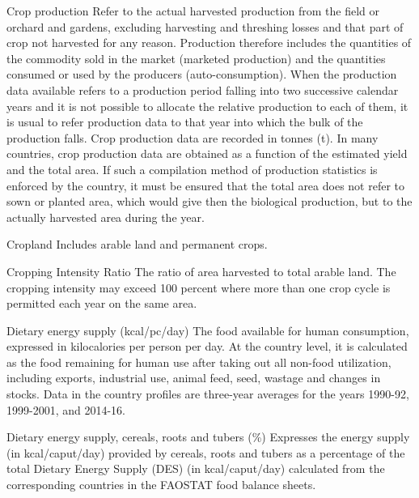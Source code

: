 \begin{MetadataCollection} {}
\begin{metadata}{Crop production} {}
Refer to the actual harvested production from the field or orchard and gardens, excluding harvesting and threshing losses and that part of crop not harvested for any reason. Production therefore includes the quantities of the commodity sold in the market (marketed production) and the quantities consumed or used by the producers (auto-consumption). When the production data available refers to a production period falling into two successive calendar years and it is not possible to allocate the relative production to each of them, it is usual to refer production data to that year into which the bulk of the production falls. Crop production data are recorded in tonnes (t). In many countries, crop production data are obtained as a function of the estimated yield and the total area. If such a compilation method of production statistics is enforced by the country, it must be ensured that the total area does not refer to sown or planted area, which would give then the biological production, but to the actually harvested area during the year.
\end{metadata}

\begin{metadata}{Cropland} {}
Includes arable land and permanent crops.
\end{metadata}

\begin{metadata}{Cropping Intensity Ratio} {}
The ratio of area harvested to total arable land. The cropping intensity may exceed 100 percent where more than one crop cycle is permitted each year on the same area.
\end{metadata}

\begin{metadata}{Dietary energy supply (kcal/pc/day)} {}
The food available for human consumption, expressed in kilocalories per person per day. At the country level, it is calculated as the food remaining for human use after taking out all non-food utilization, including exports, industrial use, animal feed, seed, wastage and changes in stocks. Data in the country profiles are three-year averages for the years 1990-92, 1999-2001, and 2014-16.
\end{metadata}

\begin{metadata}{Dietary energy supply, cereals, roots and tubers (\%)} {}
Expresses the energy supply (in kcal/caput/day) provided by cereals, roots and tubers as a percentage of the total Dietary Energy Supply (DES) (in kcal/caput/day) calculated from the corresponding countries in the FAOSTAT food balance sheets.
\end{metadata}


\end{MetadataCollection}
